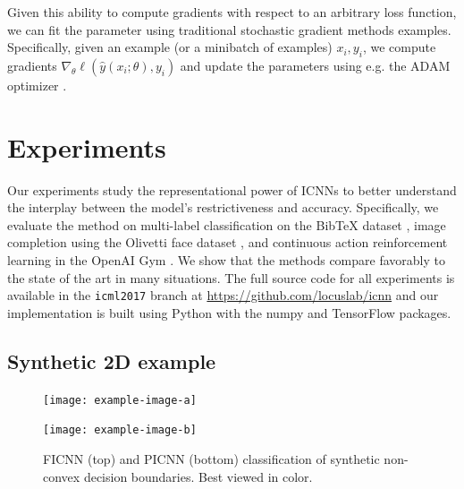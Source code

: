 Given this ability to compute gradients with respect to an arbitrary loss
function, we can fit the parameter using traditional stochastic gradient methods
examples.  Specifically, given an example (or a minibatch of examples) $x_i,
y_i$, we compute gradients $\nabla_\theta \ell(\hat{y}(x_i;\theta), y_i)$
and update the parameters using e.g. the ADAM optimizer \citep{kingma2014adam}.


\section{Experiments}
\label{sec:icnn:exps}

Our experiments study the representational power of ICNNs to
better understand the interplay between the model's
restrictiveness and accuracy.  Specifically, we evaluate the method on
multi-label classification on the BibTeX dataset \citep{katakis2008multilabel},
image completion using the Olivetti face dataset \citep{samaria1994parameterisation},
and continuous action reinforcement learning in the
OpenAI Gym \citep{brockman2016openai}. We show that the methods compare
favorably to the state of the art in many situations.
The full source code for all experiments is available in the
\verb!icml2017! branch at \url{https://github.com/locuslab/icnn} and
our implementation is built using
Python \citep{van1995python} with the numpy \citep{oliphant2006guide} and
TensorFlow \citep{abadi2016tensorflow} packages.





\subsection{Synthetic 2D example}
\begin{figure}[t]
  \centering
  \begin{minipage}{0.6\textwidth}
    \texttt{[image: example-image-a]}
  \end{minipage}
  \begin{minipage}{10mm}
    \texttt{[image: example-image-b]}
  \end{minipage}
  \caption{
    FICNN (top) and PICNN (bottom) classification of synthetic non-convex
    decision boundaries. Best viewed in color.
  }
  \label{fig:exp:synthetic}
\end{figure}

